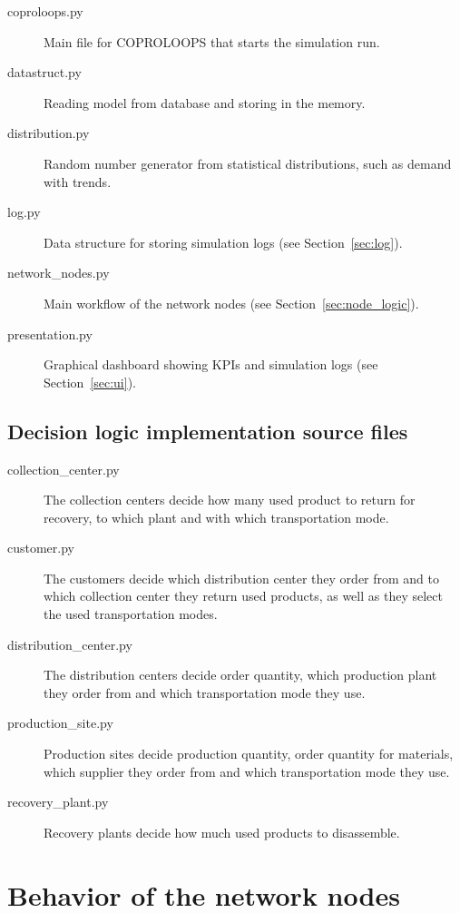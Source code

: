 \documentclass{article}
\newcommand{\NAME}{COPROLOOPS }
\begin{document}
\begin{description}
\item[coproloops.py] Main file for \NAME that starts the simulation run.
\item[datastruct.py] Reading model from database and storing in the memory.
\item[distribution.py] Random number generator from statistical distributions, such as demand with trends.
\item[log.py] Data structure for storing simulation logs (see Section~\ref{sec:log}).
\item[network\_nodes.py] Main workflow of the network nodes (see Section~\ref{sec:node_logic}).
\item[presentation.py] Graphical dashboard showing KPIs and simulation logs (see Section~\ref{sec:ui}).
\end{description}

\subsection{Decision logic implementation source files\label{sec:decision_logic}}

\begin{description}
\item[collection\_center.py] The collection centers decide how many used product to return for recovery, to which plant and with which transportation mode.
\item[customer.py] The customers decide which distribution center they order from and to which collection center they return used products, as well as they select the used transportation modes.
\item[distribution\_center.py] The distribution centers decide order quantity, which production plant they order from and which transportation mode they use.
\item[production\_site.py] Production sites decide production quantity, order quantity for materials, which supplier they order from and which transportation mode they use.
\item[recovery\_plant.py] Recovery plants decide how much used products to disassemble.
\end{description}


\section{Behavior of the network nodes\label{sec:node_logic}}
\end{document}
